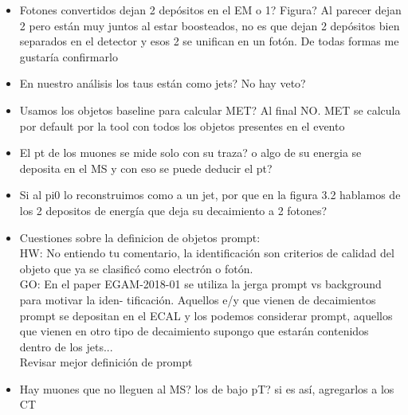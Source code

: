 \begin{itemize}
	\item Fotones convertidos dejan 2 depósitos en el EM o 1? Figura? Al parecer dejan 2 pero están muy juntos al estar boosteados, no es que dejan 2 depósitos bien separados en el detector y esos 2 se unifican en un fotón. De todas formas me gustaría confirmarlo
	\item En nuestro análisis los taus están como jets? No hay veto?
	\item Usamos los objetos baseline para calcular MET? Al final NO. MET se calcula por default por la tool con todos los objetos presentes en el evento
	\item El pt de los muones se mide solo con su traza? o algo de su energia se deposita en el MS y con eso se puede deducir el pt?
	\item Si al pi0 lo reconstruimos como a un jet, por que en la figura 3.2 hablamos de los 2 depositos de energía que deja su decaimiento a 2 fotones?
	\item Cuestiones sobre la definicion de objetos prompt: \\
	HW: No entiendo tu comentario, la identificación son criterios de calidad del objeto que ya se clasificó como electrón o fotón. \\
	GO: En	el paper EGAM-2018-01 se utiliza la jerga prompt vs background para motivar la iden-
	tificación. Aquellos e/y que vienen de decaimientos prompt se depositan en el ECAL y
	los podemos considerar prompt, aquellos que vienen en otro tipo de decaimiento supongo
	que estarán contenidos dentro de los jets... \\
	Revisar mejor definición de prompt
	\item Hay muones que no lleguen al MS? los de bajo pT? si es así, agregarlos a los CT
\end{itemize}

